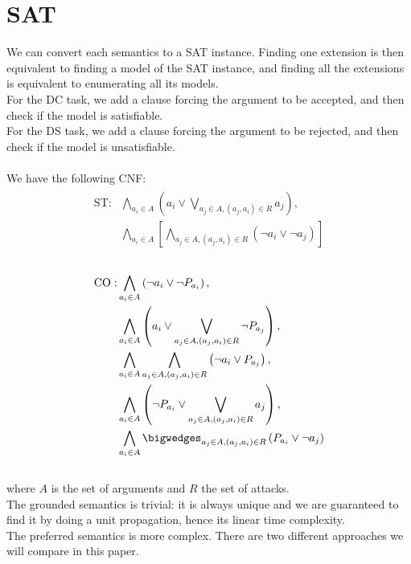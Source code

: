 \documentclass[11pt]{article}
\begin{document}
\section{SAT}
We can convert each semantics to a SAT instance.
Finding one extension is then equivalent to finding a model of the SAT instance, and finding all the extensions is equivalent to enumerating all its models. \\
For the DC task, we add a clause forcing the argument to be accepted, and then check if the model is satisfiable. \\
For the DS task, we add a clause forcing the argument to be rejected, and then check if the model is unsatisfiable. \\ \\
We have the following CNF: \\
\begin{align}
\begin{split}
\text{ST}: &\bigwedge_{a_i\in A}\left(a_i \lor \bigvee_{a_j\in A, (a_j, a_i)\in R}a_j\right), \\
&\bigwedge_{a_i\in A}\left[\bigwedge_{a_j\in A, (a_j, a_i)\in R}\left(\lnot a_i \lor \lnot a_j\right)\right]
\end{split}
\end{align} \\
\begin{align}
\begin{split}
\text{CO}: &\bigwedge_{a_i\in A}\left(\lnot a_i \lor \lnot P_{a_i}\right), \\
&\bigwedge_{a_i\in A}\left(a_i \lor \bigvee_{a_j\in A, (a_j, a_i)\in R}\lnot P_{a_j}\right), \\
&\bigwedge_{a_i\in A}\bigwedge_{a_j\in A, (a_j, a_i)\in R}\left(\lnot a_i \lor P_{a_j}\right), \\
&\bigwedge_{a_i\in A}\left(\lnot P_{a_i} \lor \bigvee_{a_j\in A, (a_j, a_i)\in R}a_j\right), \\
&\bigwedge_{a_i\in A}\bigwedges_{a_j\in A, (a_j, a_i)\in R}\left(P_{a_i} \lor \lnot a_j\right)
\end{split}
\end{align} \\
where $A$ is the set of arguments and $R$ the set of attacks\cite{lagniez2015coquiaas}. \\
The grounded semantics is trivial: it is always unique and we are guaranteed to find it by doing a unit propagation, hence its linear time complexity. \\
The preferred semantics is more complex. There are two different approaches we will compare in this paper. \\
\end{document}
